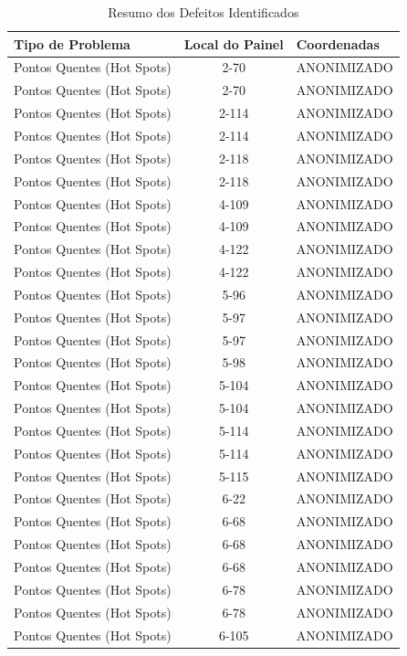 \documentclass[dvipsnames]{article}%
\begin{document}
%
\FloatBarrier%


\begin{table}[h!]%
\caption{Resumo dos Defeitos Identificados}%
\centering%
\begin{tabular}{lcl}%
\toprule%
Tipo de Problema&Local do Painel&Coordenadas\\%
\midrule%
Pontos Quentes (Hot Spots)&2{-}70&ANONIMIZADO\\%
Pontos Quentes (Hot Spots)&2{-}70&ANONIMIZADO\\%
Pontos Quentes (Hot Spots)&2{-}114&ANONIMIZADO\\%
Pontos Quentes (Hot Spots)&2{-}114&ANONIMIZADO\\%
Pontos Quentes (Hot Spots)&2{-}118&ANONIMIZADO\\%
Pontos Quentes (Hot Spots)&2{-}118&ANONIMIZADO\\%
Pontos Quentes (Hot Spots)&4{-}109&ANONIMIZADO\\%
Pontos Quentes (Hot Spots)&4{-}109&ANONIMIZADO\\%
Pontos Quentes (Hot Spots)&4{-}122&ANONIMIZADO\\%
Pontos Quentes (Hot Spots)&4{-}122&ANONIMIZADO\\%
Pontos Quentes (Hot Spots)&5{-}96&ANONIMIZADO\\%
Pontos Quentes (Hot Spots)&5{-}97&ANONIMIZADO\\%
Pontos Quentes (Hot Spots)&5{-}97&ANONIMIZADO\\%
Pontos Quentes (Hot Spots)&5{-}98&ANONIMIZADO\\%
Pontos Quentes (Hot Spots)&5{-}104&ANONIMIZADO\\%
Pontos Quentes (Hot Spots)&5{-}104&ANONIMIZADO\\%
Pontos Quentes (Hot Spots)&5{-}114&ANONIMIZADO\\%
Pontos Quentes (Hot Spots)&5{-}114&ANONIMIZADO\\%
Pontos Quentes (Hot Spots)&5{-}115&ANONIMIZADO\\%
Pontos Quentes (Hot Spots)&6{-}22&ANONIMIZADO\\%
Pontos Quentes (Hot Spots)&6{-}68&ANONIMIZADO\\%
Pontos Quentes (Hot Spots)&6{-}68&ANONIMIZADO\\%
Pontos Quentes (Hot Spots)&6{-}68&ANONIMIZADO\\%
Pontos Quentes (Hot Spots)&6{-}78&ANONIMIZADO\\%
Pontos Quentes (Hot Spots)&6{-}78&ANONIMIZADO\\%
Pontos Quentes (Hot Spots)&6{-}105&ANONIMIZADO\\%

\end{tabular}
\end{table}
\end{document}
